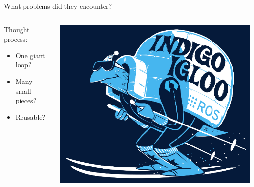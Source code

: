 \documentclass{beamer}
\begin{document}
\begin{frame}{What problems did they encounter?}
\begin{columns}
	\begin{column}{0.55\textwidth}
Thought process:
		\begin{itemize}
			\item One giant loop?
                        \item Many small pieces?
                        \item Reusable? 
		\end{itemize} \end{column} \begin{column}{0.45\textwidth} \centering \includegraphics[width=\textwidth]{fig/indigoigloo_600.png} \end{column}
\end{columns}

\end{frame}
\end{document}
